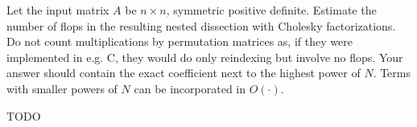 \documentclass{../../../kin_math}
\begin{document}
\begin{questions}
  \question Let the input matrix $A$ be $n \times n$, symmetric positive definite. Estimate the number of flops in the resulting nested dissection with Cholesky factorizations. Do not count multiplications by permutation matrices as, if they were implemented in e.g. C, they would do only reindexing but involve no flops. Your answer should contain the exact coefficient next to the highest power of $N$. Terms with smaller powers of $N$ can be incorporated in $O(\cdot)$.
  \begin{solution}
    TODO
  \end{solution}
\end{questions}
\end{document}
